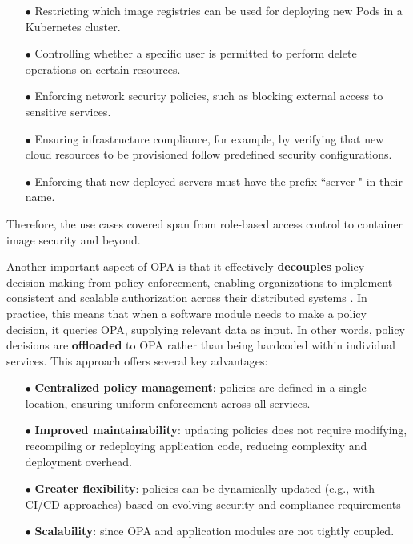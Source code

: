 \begin{itemize}[itemsep=0.2pt, topsep=1pt] \item[$\bullet$] Restricting which image registries can be used for deploying new Pods in a Kubernetes cluster.
\item[$\bullet$] Controlling whether a specific user is permitted to perform delete operations on certain resources.
\item[$\bullet$] Enforcing network security policies, such as blocking external access to sensitive services.
\item[$\bullet$] Ensuring infrastructure compliance, for example, by verifying that new cloud resources to be provisioned follow predefined security configurations.
\item[$\bullet$] Enforcing that new deployed servers must have the prefix ``server-" in their name.
\end{itemize}
Therefore, the use cases covered span from role-based access control to container image security and beyond.
\newline


Another important aspect of OPA is that it effectively \textbf{decouples} policy decision-making from policy enforcement, enabling organizations to implement consistent and scalable authorization across their distributed systems \cite{test}.
In practice, this means that when a software module needs to make a policy decision, it queries OPA, supplying relevant data as input. In other words, policy decisions are \textbf{offloaded} to OPA rather than being hardcoded within individual services. This approach offers several key advantages:
\begin{itemize}[itemsep=0.2pt, topsep=1pt]
  \item[$\bullet$] \textbf{Centralized policy management}: policies are defined in a single location, ensuring uniform enforcement across all services.
  \item[$\bullet$] \textbf{Improved maintainability}: updating policies does not require modifying, recompiling or redeploying application code, reducing complexity and deployment overhead.
  \item[$\bullet$] \textbf{Greater flexibility}: policies can be dynamically updated (e.g., with CI/CD approaches) based on evolving security and compliance requirements 
  \item[$\bullet$] \textbf{Scalability}: since OPA and application modules are not tightly coupled.
\end{itemize} 




